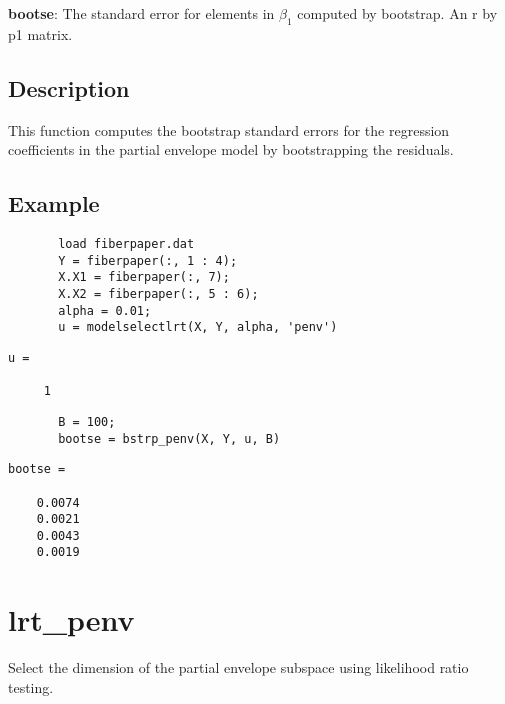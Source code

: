 \documentclass[a4paper,11pt,openany]{memoir}
\begin{document}
\begin{par}
\textbf{bootse}: The standard error for elements in $\beta_1$ computed by bootstrap.  An r by p1 matrix.
\end{par} \vspace{1em}


\subsection*{Description}

\begin{par}
This function computes the bootstrap standard errors for the regression coefficients in the partial envelope model by bootstrapping the residuals.
\end{par} \vspace{1em}


\subsection*{Example}


\begin{verbatim}       load fiberpaper.dat
       Y = fiberpaper(:, 1 : 4);
       X.X1 = fiberpaper(:, 7);
       X.X2 = fiberpaper(:, 5 : 6);
       alpha = 0.01;
       u = modelselectlrt(X, Y, alpha, 'penv')\end{verbatim}
               \color{lightgray}\ttfamily \begin{verbatim}
u =

     1
\end{verbatim} \rmfamily
\color{black}
\begin{verbatim}       B = 100;
       bootse = bstrp_penv(X, Y, u, B)\end{verbatim}
    
        \color{lightgray}\ttfamily \begin{verbatim}
bootse =

    0.0074
    0.0021
    0.0043
    0.0019

\end{verbatim} \rmfamily
\color{black}
    

\newpage


\rmfamily
\color{black}\section{lrt\_penv}

\begin{par}
Select the dimension of the partial envelope subspace using likelihood ratio testing.
\end{par} \vspace{1em}
\end{document}
